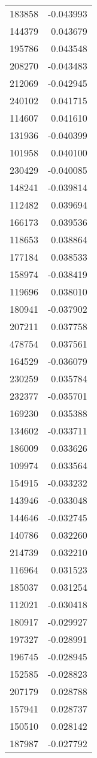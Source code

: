 \begin{tabular}{lr}
183858 & -0.043993 \\
144379 & 0.043679 \\
195786 & 0.043548 \\
208270 & -0.043483 \\
212069 & -0.042945 \\
240102 & 0.041715 \\
114607 & 0.041610 \\
131936 & -0.040399 \\
101958 & 0.040100 \\
230429 & -0.040085 \\
148241 & -0.039814 \\
112482 & 0.039694 \\
166173 & 0.039536 \\
118653 & 0.038864 \\
177184 & 0.038533 \\
158974 & -0.038419 \\
119696 & 0.038010 \\
180941 & -0.037902 \\
207211 & 0.037758 \\
478754 & 0.037561 \\
164529 & -0.036079 \\
230259 & 0.035784 \\
232377 & -0.035701 \\
169230 & 0.035388 \\
134602 & -0.033711 \\
186009 & 0.033626 \\
109974 & 0.033564 \\
154915 & -0.033232 \\
143946 & -0.033048 \\
144646 & -0.032745 \\
140786 & 0.032260 \\
214739 & 0.032210 \\
116964 & 0.031523 \\
185037 & 0.031254 \\
112021 & -0.030418 \\
180917 & -0.029927 \\
197327 & -0.028991 \\
196745 & -0.028945 \\
152585 & -0.028823 \\
207179 & 0.028788 \\
157941 & 0.028737 \\
150510 & 0.028142 \\
187987 & -0.027792 \\

\end{tabular}
